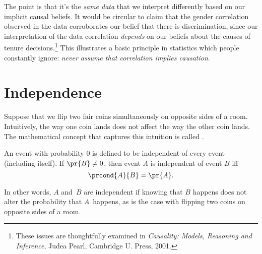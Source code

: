 \begin{editingnotes}
The point is that it's the \emph{same data} that we interpret
differently based on our implicit causal beliefs.  It would be
circular to claim that the gender correlation observed in the data
corroborates our belief that there is discrimination, since our
interpretation of the data correlation \emph{depends} on our beliefs
about the causes of tenure decisions.\footnote{These issues are
  thoughtfully examined in \emph{Causality: Models, Reasoning and
    Inference}, Judea Pearl, Cambridge U. Press, 2001.}  This
illustrates a basic principle in statistics which people constantly
ignore: \emph{never assume that correlation implies causation}.

\end{editingnotes}



\begin{problems}
\practiceproblems
{}

\classproblems
{}

\homeworkproblems
{}

\examproblems
{}
\end{problems}

\section{Independence}
Suppose that we flip two fair coins simultaneously on opposite sides
of a room.  Intuitively, the way one coin lands does not affect the
way the other coin lands.  The mathematical concept that captures
this intuition is called .
\begin{definition}\label{def:independence}
An event with probability 0 is defined to be independent of every
event (including itself).  If $\pr{B} \neq 0$, then
event $A$ is independent of event $B$ iff
\begin{equation}\label{eqn:independence}
    \prcond{A}{B} = \pr{A}.
\end{equation}
\end{definition}
In other words, $A$ and~$B$ are independent if knowing that $B$
happens does not alter the probability that $A$~happens, as is the
case with flipping two coins on opposite sides of a room.

